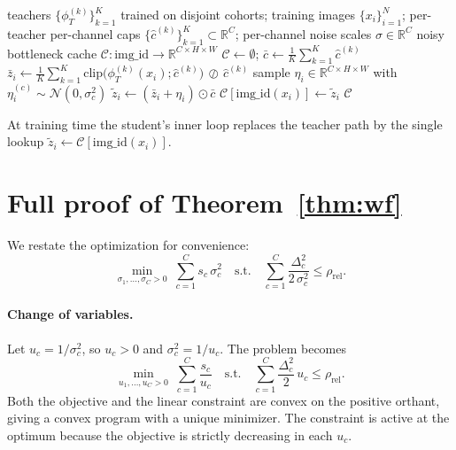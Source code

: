 \begin{algorithm}[t]
\caption{Sample-once PATE precompute of noisy bottlenecks.}
\label{alg:precompute}
\begin{algorithmic}[1]
\Require teachers $\{\phi_T^{(k)}\}_{k=1}^{K}$ trained on disjoint
         cohorts; training images $\{x_i\}_{i=1}^{N}$;
         per-teacher per-channel caps
         $\{\widehat{c}^{(k)}\}_{k=1}^{K}\subset\mathbb{R}^{C}$;
         per-channel noise scales $\sigma\in\mathbb{R}^{C}$
\Ensure  noisy bottleneck cache
         $\mathcal{C}:\mathrm{img\_id}\!\to\!\mathbb{R}^{C\times H\times W}$
\State $\mathcal{C} \gets \emptyset$;\quad
       $\bar{c} \gets \tfrac{1}{K}\sum_{k=1}^{K}\widehat{c}^{(k)}$
  \State $\bar{z}_i \gets \tfrac{1}{K}\sum_{k=1}^{K} \mathrm{clip}\bigl(\phi_T^{(k)}(x_i);\widehat{c}^{(k)}\bigr) \,\oslash\,\widehat{c}^{(k)}$
  \State sample $\eta_i \in \mathbb{R}^{C\times H\times W}$ with
         $\eta_i^{(c)} \!\sim\! \mathcal{N}(0,\sigma_c^{2})$
  \State $\widetilde{z}_i \gets (\bar{z}_i + \eta_i)\odot\bar{c}$
  \State $\mathcal{C}[\mathrm{img\_id}(x_i)] \gets \widetilde{z}_i$
\EndFor
\State \Return $\mathcal{C}$
\end{algorithmic}
\end{algorithm}

\noindent At training time the student's inner loop replaces the
teacher path by the single lookup $\widetilde{z}_i \leftarrow
\mathcal{C}[\mathrm{img\_id}(x_i)]$.

\section{Full proof of Theorem~\ref{thm:wf}}
\label{app:proof}

We restate the optimization for convenience:
\begin{equation*}
\min_{\sigma_1,\ldots,\sigma_C>0}\; \sum_{c=1}^{C} s_c\,\sigma_c^{2}
\quad\text{s.t.}\quad
\sum_{c=1}^{C} \frac{\Delta_c^{2}}{2\,\sigma_c^{2}} \le \rho_{\mathrm{rel}}.
\end{equation*}

\paragraph{Change of variables.}
Let $u_c = 1/\sigma_c^{2}$, so $u_c > 0$ and $\sigma_c^{2} = 1/u_c$.
The problem becomes
\begin{equation}
\min_{u_1,\ldots,u_C>0}\; \sum_{c=1}^{C} \frac{s_c}{u_c}
\quad\text{s.t.}\quad
\sum_{c=1}^{C} \frac{\Delta_c^{2}}{2}\,u_c \le \rho_{\mathrm{rel}}.
\label{eq:dual}
\end{equation}
Both the objective and the linear constraint are convex on the
positive orthant, giving a convex program with a unique minimizer.
The constraint is active at the optimum because the objective is
strictly decreasing in each $u_c$.

